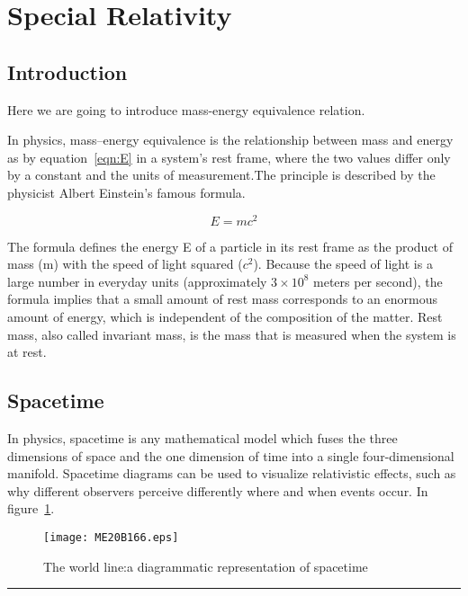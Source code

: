 \section{Special Relativity}


\subsection{Introduction}

Here we are going to introduce mass-energy equivalence relation.

In physics, mass–energy equivalence is the relationship between mass and energy as by equation~\ref{eqn:E} in a system's rest frame, where the two values differ only by a constant and the units of measurement.The principle is described by the physicist Albert Einstein's famous formula.~\cite{Einstie}

\begin{equation}
	E=mc^2
	\label{eqn:E}
\end{equation}

The formula defines the energy E of a particle in its rest frame as the product of mass (m) with the speed of light squared ($c^2$). Because the speed of light is a large number in everyday units (approximately $3 \times 10 ^8$ meters per second), the formula implies that a small amount of rest mass corresponds to an enormous amount of energy, which is independent of the composition of the matter. Rest mass, also called invariant mass, is the mass that is measured when the system is at rest.


\subsection{Spacetime}

In physics, spacetime is any mathematical model which fuses the three dimensions of space and the one dimension of time into a single four-dimensional manifold. Spacetime diagrams can be used to visualize relativistic effects, such as why different observers perceive differently where and when events occur. In figure~\ref{f1:spacetime}.~\cite{Einstie}

\begin{figure}[h]
	\begin{center}
		\texttt{[image: ME20B166.eps]}
	\end{center}
	\caption{The world line:a diagrammatic representation of spacetime}
	\label{f1:spacetime}
\end{figure}

\hrule

